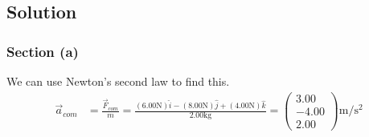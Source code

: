 \documentclass[12pt]{article}
\begin{document}
\subsection{Solution}
\subsubsection{Section (a)}
We can use Newton's second law to find this.
\begin{align}
    \vec{a}_{com}   &=  \frac{\vec{F}_{com}}{m}
        =   \frac{(6.00 \unit{\newton})\hat{i} - (8.00 \unit{\newton})\hat{j} + (4.00 \unit{\newton})\hat{k}}{2.00\unit{\kilo\gram}}
        =   \boxed{\begin{pmatrix}3.00\\-4.00\\2.00\end{pmatrix}\unit{\meter/\second^2}}
\end{align}
\end{document}
